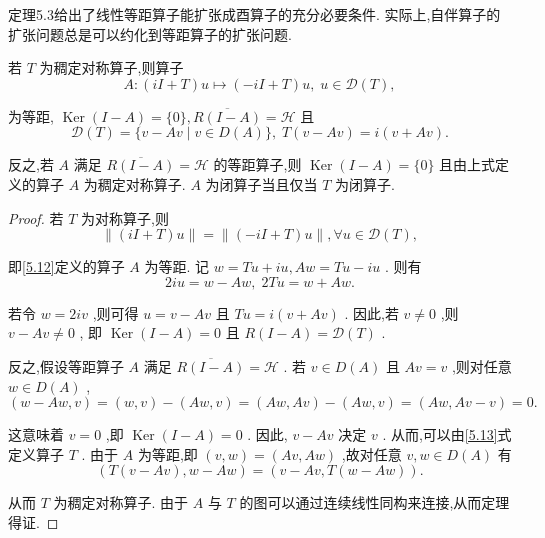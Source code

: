 \documentclass[lang=cn,newtx,10pt,scheme=chinese,thmcnt=chapter]{elegantbook}
\begin{document}
定理5.3给出了线性等距算子能扩张成酉算子的充分必要条件. 实际上,自伴算子的扩张问题总是可以约化到等距算子的扩张问题.

\begin{proposition}
     若 \(T\) 为稠定对称算子,则算子
\begin{equation}
A : \left( {{iI} + T}\right) u \mapsto  \left( {-{iI} + T}\right) u,\;u \in  \mathcal{D}(T) , \label{5.12}
\end{equation}

为等距, \(\operatorname{Ker}\left( {I - A}\right)  = \{ 0\} ,\overline{R\left( {I - A}\right) } = \mathcal{H}\) 且
\begin{equation}
\mathcal{D}(T)  = \{ v - {Av} \mid  v \in  D\left( A\right) \} ,\;T\left( {v - {Av}}\right)  = i\left( {v + {Av}}\right) . \label{5.13}
\end{equation}

反之,若 \(A\) 满足 \(\overline{R\left( {I - A}\right) } = \mathcal{H}\) 的等距算子,则 \(\operatorname{Ker}\left( {I - A}\right)  = \{ 0\}\) 且由上式定义的算子 \(A\) 为稠定对称算子. \(A\) 为闭算子当且仅当 \(T\) 为闭算子.
\end{proposition}
\begin{proof}
    若 \(T\) 为对称算子,则
\begin{equation*}
\parallel \left( {{iI} + T}\right) u\parallel  = \parallel \left( {-{iI} + T}\right) u\parallel ,\forall u \in  \mathcal{D}(T) ,
\end{equation*}

即\ref{5.12}定义的算子 \(A\) 为等距. 记 \(w = {Tu} + {iu},{Aw} = {Tu} - {iu}\) . 则有
\begin{equation*}
{2iu} = w - {Aw},\;{2Tu} = w + {Aw}.
\end{equation*}

若令 \(w = {2iv}\) ,则可得 \(u = v - {Av}\) 且 \({Tu} = i\left( {v + {Av}}\right)\) . 因此,若 \(v \neq  0\) ,则 \(v - {Av} \neq  0\) , 即 \(\operatorname{Ker}\left( {I - A}\right)  = 0\) 且 \(R\left( {I - A}\right)  = \mathcal{D}(T)\) .

反之,假设等距算子 \(A\) 满足 \(\overline{R\left( {I - A}\right) } = \mathcal{H}\) . 若 \(v \in  D\left( A\right)\) 且 \({Av} = v\) ,则对任意 \(w \in  D\left( A\right)\) ,
\begin{equation*}
\left( {w - {Aw},v}\right)  = \left( {w,v}\right)  - \left( {{Aw},v}\right)  = \left( {{Aw},{Av}}\right)  - \left( {{Aw},v}\right)  = \left( {{Aw},{Av} - v}\right)  = 0.
\end{equation*}

这意味着 \(v = 0\) ,即 \(\operatorname{Ker}\left( {I - A}\right)  = 0\) . 因此, \(v - {Av}\) 决定 \(v\) . 从而,可以由\ref{5.13}式定义算子 \(T\) . 由于 \(A\) 为等距,即 \(\left( {v,w}\right)  = \left( {{Av},{Aw}}\right)\) ,故对任意 \(v,w \in  D\left( A\right)\) 有
\begin{equation*}
\left( {T\left( {v - {Av}}\right) ,w - {Aw}}\right)  = \left( {v - {Av},T\left( {w - {Aw}}\right) }\right) .
\end{equation*}

从而 \(T\) 为稠定对称算子. 由于 \(A\) 与 \(T\) 的图可以通过连续线性同构来连接,从而定理得证.

\end{proof}
\end{document}
